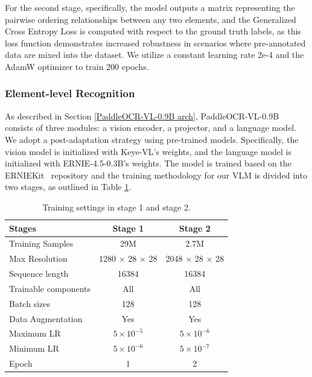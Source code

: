 \documentclass[11pt, a4paper,logo,  copyright, nonumbering]{paddleocr}
\begin{document}
For the second stage, specifically, the model outputs a matrix representing the pairwise ordering relationships between any two elements, and the Generalized Cross Entropy Loss \cite{zhang2018generalized} is computed with respect to the ground truth labels, as this loss function demonstrates increased robustness in scenarios where pre-annotated data are mixed into the dataset. We utilize a constant learning rate 2e-4 and the AdamW optimizer to train 200 epochs.

\subsubsection{Element-level Recognition}

\label{Element-level Recognition}

As described in Section \ref{PaddleOCR-VL-0.9B arch}, PaddleOCR-VL-0.9B consists of three modules: a vision encoder, a projector, and a language model. We adopt a post-adaptation strategy using pre-trained models. Specifically, the vision model is initialized with Keye-VL's weights, and the language model is initialized with ERNIE-4.5-0.3B's weights. The model is trained based on the ERNIEKit~\cite{ERNIEkit} repository and the training methodology for our VLM is divided into two stages, as outlined in Table \ref{training}.


\begin{table}[h]
\centering
 \fontsize{7}{7}\selectfont
\renewcommand{\arraystretch}{1.2}
\begin{tabular}{l|cc}
\toprule
\textbf{Stages} & \textbf{Stage 1} & \textbf{Stage 2} \\  \midrule
Training Samples & 29M & 2.7M \\
Max Resolution & 1280 $\times$ 28 $\times$ 28 & 2048 $\times$ 28 $\times$ 28 \\
Sequence length & 16384 & 16384 \\
Trainable components & All & All \\
Batch sizes & 128 & 128 \\
Data Augmentation & Yes & Yes \\
Maximum LR & $5 \times 10^{-5}$ & $5 \times 10^{-6}$ \\
Minimum LR & $5 \times 10^{-6}$ & $5 \times 10^{-7}$ \\
Epoch & 1 & 2 \\ \bottomrule
\end{tabular}
\caption{Training settings in stage 1 and stage 2.}
\label{training}
\end{table}
\end{document}
